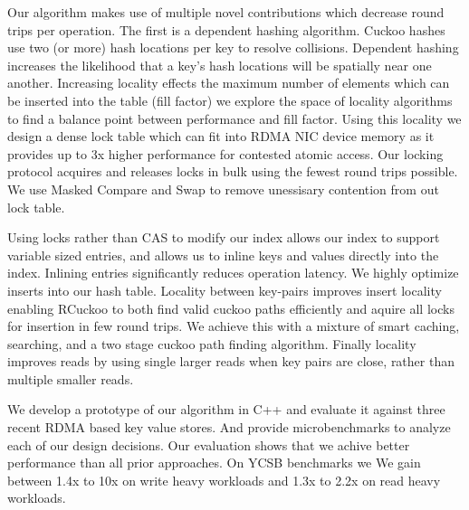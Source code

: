 Our algorithm makes use of multiple novel contributions
which decrease round trips per operation. The first is a
dependent hashing algorithm. Cuckoo hashes use two (or more)
hash locations per key to resolve collisions. Dependent
hashing increases the likelihood that a key's hash locations
will be spatially near one another. Increasing locality
effects the maximum number of elements which can be inserted
into the table (fill factor) we explore the space of
locality algorithms to find a balance point between
performance and fill factor. Using this locality we design a
dense lock table which can fit into RDMA NIC device memory
as it provides up to 3x higher performance for contested
atomic access. Our locking protocol acquires and releases
locks in bulk using the fewest round trips possible. We use
Masked Compare and Swap to remove unessisary contention from
out lock table.

Using locks rather than CAS to modify our index allows our
index to support variable sized entries, and allows us to
inline keys and values directly into the index. Inlining
entries significantly reduces operation latency. We highly
optimize inserts into our hash table. Locality between
key-pairs improves insert locality enabling RCuckoo to both
find valid cuckoo paths efficiently and aquire all locks for
insertion in few round trips. We achieve this with a mixture
of smart caching, searching, and a two stage cuckoo path
finding algorithm. Finally locality improves reads by using
single larger reads when key pairs are close, rather than
multiple smaller reads.



We develop a prototype of our algorithm in C++ and evaluate
it against three recent RDMA based key value stores. And
provide microbenchmarks to analyze each of our design
decisions. Our evaluation shows that we achive better
performance than all prior approaches. On YCSB benchmarks we
We gain between 1.4x to 10x on write heavy workloads and
1.3x to 2.2x on read heavy workloads. 
